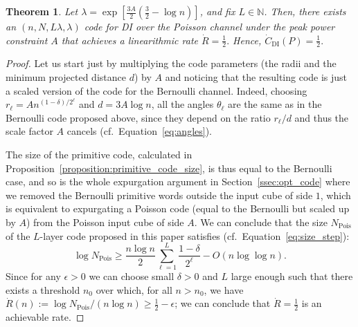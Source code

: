 \documentclass[10pt, conference]{IEEEtran}
\newtheorem{theorem}{Theorem}
\newcommand{\1}{\mathds{1}}
\newcommand{\NN}{\mathbb{N}}
\begin{document}
\begin{theorem}\label{thm:Poisson}
Let $\lambda=\exp\left[\frac{3A}{2}\left(\frac32-\log n\right)\right]$, and fix $L\in \NN$. Then, there exists an $(n,N,L\lambda,\lambda)$ code for DI over the Poisson channel under the peak power constraint $A$ that achieves a linearithmic rate 
\(
\dot{R}=\frac{1}{2}.
\)
Hence, 
\(
\dot{C}_\text{DI}(P)=\frac12.
\)
\end{theorem}
\begin{proof}
Let us start just by multiplying the code parameters (the radii and the minimum projected distance $d$) by $A$ and noticing that the resulting code is just a scaled version of the code for the Bernoulli channel. Indeed, choosing $r_\ell=An^{(1-\delta)/2^\ell}$ and $d=3A\log n$, all the angles $\theta_\ell$ are the same as in the Bernoulli code proposed above, since they depend on the ratio $r_\ell/d$ and thus the scale factor $A$ cancels (cf.~Equation~\ref{eq:angles}). 

The size of the primitive code, calculated in Proposition~\ref{proposition:primitive_code_size}, is thus equal to the Bernoulli case, and so is the whole expurgation argument in Section~\ref{ssec:opt_code} where we removed the Bernoulli primitive words outside the input cube of side $1$, which is equivalent to expurgating a Poisson code (equal to the Bernoulli but scaled up by $A$) from the Poisson input cube of side $A$. We can conclude that the size $N_\text{Pois}$ of the $L$-layer code proposed in this paper satisfies (cf.~Equation~\eqref{eq:size_step}):
\begin{equation}
\log N_{\text{Pois}}\geq\frac{n\log n}{2}\sum_{\ell=1}^L\frac{1-\delta}{2^\ell}-O(n\log\log n).
\end{equation}
Since for any $\epsilon>0$ we can choose small $\delta>0$ and $L$ large enough such that there exists a threshold $n_0$ over which, for all $n>n_0$, we have $\dot R(n):=\log N_{\text{Pois}}/(n\log n)\geq\frac12-\epsilon$; we can conclude that $\dot R=\frac12$ is an achievable rate.


\end{proof}
\end{document}
